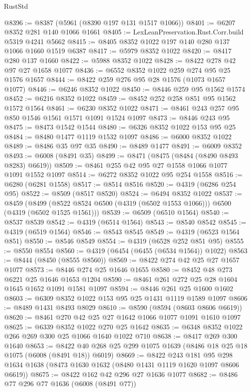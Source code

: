 \begin{lexlean}{RustStd}
\begin{coremodule}
@8396 := @8387 (@5961 (@8390 @197 @131 @1517 @1066))
@8401 := @6207 @8352 @281 @140 @1066 @1661
@8405 := LexLeanPreservation.Rust.Corr.build @5319 @4241 @5662
@8415 := @8405 @8352 @1022 @197 @140 @280 @137 @1066 @1660 @1519 @6387
@8417 := @5979 @8352 @1022
@8420 := @8417 @280 @137 @1660
@8422 := @5988 @8352 @1022
@8428 := @8422 @278 @42 @97 @27 @1658 @1077
@8436 := @6552 @8352 @1022 @259 @274 @95 @25 @1576 @1657
@8444 := @8422 @259 @276 @95 @28 @1576 (@1073 @1657 @1077)
@8446 := @6246 @8352 @1022
@8450 := @8446 @259 @95 @1562 @1574
@8452 := @6216 @8352 @1022
@8459 := @8452 @252 @258 @851 @95 @1562 @1572 @1564
@8461 := @6230 @8352 @1022
@8471 := @8461 @243 @257 @95 @850 @1546 @1561 @1571 @1091 @1524 @1097
@8473 := @8446 @243 @95
@8475 := @8473 @1542 @1544
@8480 := @6326 @8352 @1022 @153 @95 @25
@8484 := @8480 @1477 @1119 @1532 @1097
@8486 := @6000 @8352 @1022
@8489 := @8486 @35 @97 @35
@8490 := @8489 @1477
@8491 := @6009 @8352
@8493 := @6008 (@8491 @35)
@8499 := @8471 (@8475 (@8484 (@8490 @8493 @8283) @6619))
@8509 := @8461 @255 @42 @95 @27 @1558 @1066 @1077 @1091 @1552 @1097
@8514 := @6272 @8352 @1022 @95 @254 @1558
@8516 := @6280 (@6281 @1558)
@8517 := @8514 @8516
@8520 := @4319 (@6286 @254 @95)
@8522 := @8509 (@8517 @8520)
@8524 := @6494 @8352 @1022
@8537 := @8459
    (@8499 (@8522 @8524 @6500 (@4319 (@6502 @1553 @1066))) @6500 (@4319 (@6502 @1525 @1561)))
@8539 := @6509 (@6510 @1564)
@8540 := @8537 @8539
@8542 := @4319 (@6514 @1564)
@8543 := @8540 @8542
@8545 := @4319 (@6519 @1564)
@8546 := @8543 @8545
@8549 := @4319 (@6523 @1564 @851)
@8550 := @8546 @8549
@8554 := @4319 (@6528 @252 @851 @95)
@8555 := @8550 @8554
@8560 := @4319 (@6454 (@6455 (@6534 @1564)) @1022)
@8563 := @8444 (@8450 (@8555 @8560))
@8569 := @8422 @274 @42 @25 @27 @1657 @1077
@8573 := @8446 @274 @25 @1646 @1655
@8580 := @8452 @48 @273 @6221 @25 @1646 @1653 @1204
@8590 := @8461 @261 @272 @25 @28 @1604 @1645 @1652 @1091 @1581 @1097
@8594 := @8446 @261 @25 @1600 @1602
@8603 := @6309 @8352 @1022 @153 @95 @25 @1431 @1119 @1589 @1097
@8606 := @8489 @1431 @8493 @8029
@8610 := @8590 (@8594 (@8603 @8606 @6619))
@8620 := @8461 @270 @42 @25 @27 @1642 @1066 @1077 @1091 @1610 @1097
@8625 := @6339 @8352 @1022 @270 @25 @1642
@8635 := @6348 @8352 @1022 @266 @269 @300 @25 @1066 @1640 @1022 @710
@8638 := @8417 @269 @300 @1640
@8653 := @8422 @40 @268 @25 @299 @1075 @1639 (@8486 @18 @25 @18 @1075 (@6008 (@8491 @18)) @6019)
@8669 := @8422
    @243
    @181
    @95
    @298
    @1634
    @1638
    (@8473 @1630 @1632 (@8480 @1431 @1119 @1620 @1097 @8606 @6619))
@8675 := @8422 @162 @42 @296 @27 @1636 @1077
@8682 := @8486 @77 @296 @77 @1636 (@6008 (@8491 @77))

\end{coremodule}
\end{lexlean}
